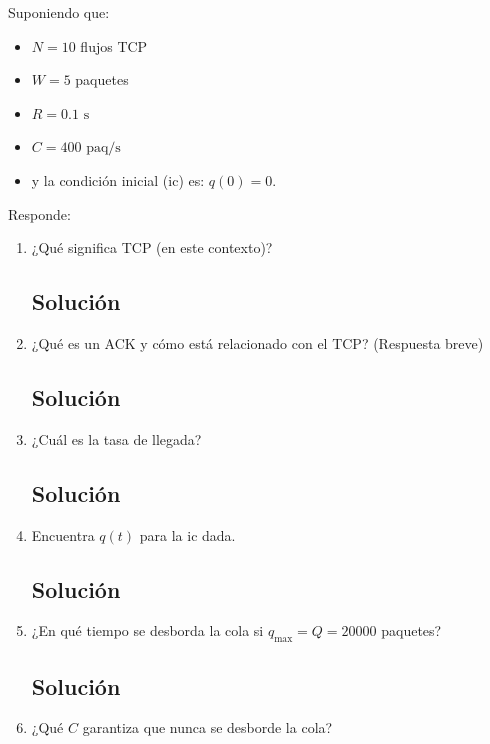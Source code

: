 \begin{enumerate}[label=\arabic*., leftmargin=*]
    Suponiendo que:
    \begin{itemize}[leftmargin=*]
        \item $N = 10$ flujos TCP
        \item $W = 5$ paquetes
        \item $R = 0.1\text{ s}$
        \item $C = 400\text{ paq}/\text{s}$
        \item y la condición inicial (ic) es: $q(0) = 0$.
    \end{itemize}

    Responde:
    \begin{enumerate}[label=(\alph*), leftmargin=*]
        \item ¿Qué significa TCP (en este contexto)?
        \subsection*{Solución}

        \item ¿Qué es un ACK y cómo está relacionado con el TCP? (Respuesta breve)
        \subsection*{Solución}

        \item ¿Cuál es la tasa de llegada?
        \subsection*{Solución}

        \item Encuentra $q(t)$ para la ic dada.
        \subsection*{Solución}

        \item ¿En qué tiempo se desborda la cola si $q_{\max} = Q = 20000$ paquetes?
        \subsection*{Solución}

        \item ¿Qué $C$ garantiza que nunca se desborde la cola?

\end{enumerate}
\end{enumerate}
